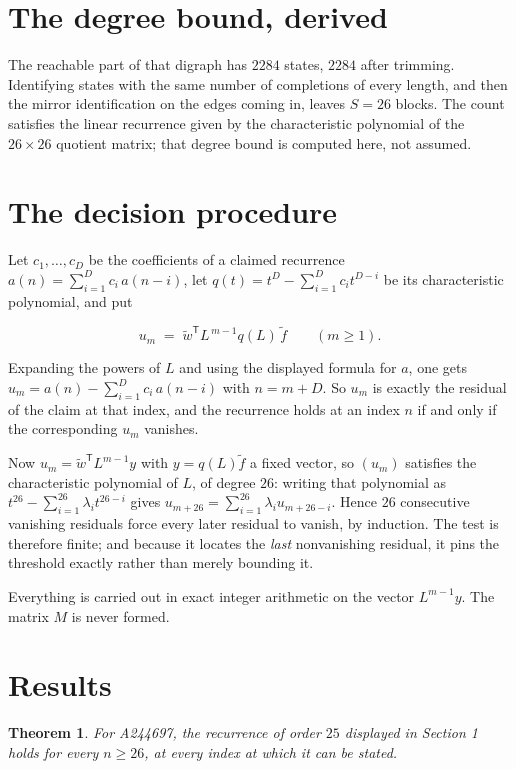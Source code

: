 \documentclass[11pt]{article}
\newtheorem{theorem}{Theorem}
\theoremstyle{definition}
\begin{document}
\section{The degree bound, derived}

The reachable part of that digraph has $2284$ states, $2284$ after trimming. Identifying states with the same number of completions of every length, and then the mirror identification on the edges coming in, leaves $S = 26$ blocks. The count satisfies the linear recurrence given by the characteristic polynomial of the $26\times26$ quotient matrix; that degree bound is computed here, not assumed.

\section{The decision procedure}

Let $c_1,\dots,c_D$ be the coefficients of a claimed recurrence $a(n) = \sum_{i=1}^{D} c_i\,a(n-i)$, let $q(t) = t^{D} - \sum_{i=1}^{D} c_i t^{D-i}$ be its characteristic polynomial, and put

\[u_m \;=\; \tilde w^{\mathsf T} L^{\,m-1} q(L)\,\tilde f \qquad (m \ge 1).\]

Expanding the powers of $L$ and using the displayed formula for $a$, one gets $u_m = a(n) - \sum_{i=1}^{D} c_i\,a(n-i)$ with $n = m + D$. So $u_m$ is exactly the residual of the claim at that index, and the recurrence holds at an index $n$ if and only if the corresponding $u_m$ vanishes.

Now $u_m = \tilde w^{\mathsf T} L^{m-1} y$ with $y = q(L)\tilde f$ a fixed vector, so $(u_m)$ satisfies the characteristic polynomial of $L$, of degree $26$: writing that polynomial as $t^{26} - \sum_{i=1}^{26} \lambda_i t^{26-i}$ gives $u_{m+26} = \sum_{i=1}^{26} \lambda_i u_{m+26-i}$. Hence $26$ consecutive vanishing residuals force every later residual to vanish, by induction. The test is therefore finite; and because it locates the {\itshape last} nonvanishing residual, it pins the threshold exactly rather than merely bounding it.

Everything is carried out in exact integer arithmetic on the vector $L^{m-1}y$. The matrix $M$ is never formed.

\section{Results}

\begin{theorem} For A244697, the recurrence of order $25$ displayed in Section 1 holds for every $n \ge 26$, at every index at which it can be stated.\end{theorem}
\end{document}
